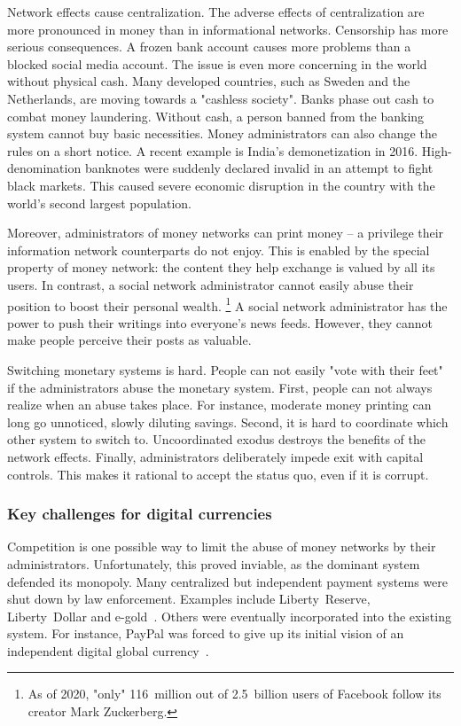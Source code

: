 Network effects cause centralization.
The adverse effects of centralization are more pronounced in money than in informational networks.
Censorship has more serious consequences.
A frozen bank account causes more problems than a blocked social media account.
The issue is even more concerning in the world without physical cash.
Many developed countries, such as Sweden and the Netherlands, are moving towards a "cashless society".
Banks phase out cash to combat money laundering.
Without cash, a person banned from the banking system cannot buy basic necessities.
Money administrators can also change the rules on a short notice.
A recent example is India's demonetization in 2016.
High-denomination banknotes were suddenly declared invalid in an attempt to fight black markets.
This caused severe economic disruption in the country with the world's second largest population.

Moreover, administrators of money networks can print money -- a privilege their information network counterparts do not enjoy.
This is enabled by the special property of money network: the content they help exchange is valued by all its users.
In contrast, a social network administrator cannot easily abuse their position to boost their personal wealth.
\footnote{As of 2020, "only" 116~million out of 2.5~billion users of Facebook follow its creator Mark Zuckerberg.}
A social network administrator has the power to push their writings into everyone's news feeds.
However, they cannot make people perceive their posts as valuable.

Switching monetary systems is hard.
People can not easily "vote with their feet" if the administrators abuse the monetary system.
First, people can not always realize when an abuse takes place.
For instance, moderate money printing can long go unnoticed, slowly diluting savings.
Second, it is hard to coordinate which other system to switch to.
Uncoordinated exodus destroys the benefits of the network effects.
Finally, administrators deliberately impede exit with capital controls.
This makes it rational to accept the status quo, even if it is corrupt.


\subsubsection*{Key challenges for digital currencies}

Competition is one possible way to limit the abuse of money networks by their administrators.
Unfortunately, this proved inviable, as the dominant system defended its monopoly.
Many centralized but independent payment systems were shut down by law enforcement.
Examples include Liberty~Reserve, Liberty~Dollar and e-gold~\cite{White2014, Trautman2014}.
Others were eventually incorporated into the existing system.
For instance, PayPal was forced to give up its initial vision of an independent digital global currency~\cite{Jackson2017}.

